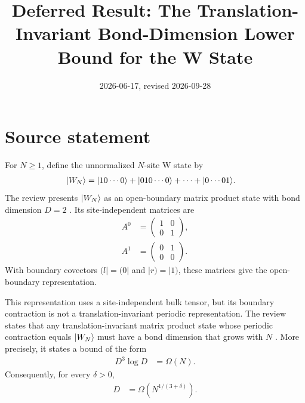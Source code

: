 \documentclass{article}
\title{Deferred Result: The Translation-Invariant Bond-Dimension Lower Bound
for the W State}
\author{}
\date{2026-06-17, revised 2026-09-28}
\begin{document}
\maketitle
{}

\section{Source statement}

For $N\geq 1$, define the unnormalized $N$-site W state by
\begin{align}
    |W_N\rangle
     & =
    |10\cdots 0\rangle
    +|010\cdots 0\rangle
    +\cdots
    +|0\cdots 01\rangle.
    \label{eq:rmp_w_state_ti_bound_w_state}
\end{align}
The review presents $|W_N\rangle$ as an open-boundary matrix product state with
bond dimension $D=2$ \cite[lines~2352--2361]{Cirac2021Matrix}. Its
site-independent matrices are
\begin{align}
    A^0
     & =
    \begin{pmatrix}
        1 & 0 \\
        0 & 1
    \end{pmatrix},
    \label{eq:rmp_w_state_ti_bound_zero_matrix} \\
    A^1
     & =
    \begin{pmatrix}
        0 & 1 \\
        0 & 0
    \end{pmatrix}.
    \label{eq:rmp_w_state_ti_bound_one_matrix}
\end{align}
With boundary covectors $(l|=(0|$ and $|r)=|1)$, these matrices give the
open-boundary representation.

This representation uses a site-independent bulk tensor, but its boundary
contraction is not a translation-invariant periodic representation. The review
states that any translation-invariant matrix product state whose periodic
contraction equals $|W_N\rangle$ must have a bond dimension that grows with
$N$ \cite[line~2362]{Cirac2021Matrix}. More precisely, it states a bound of
the form
\begin{align}
    D^3\log D
     & =
    \Omega(N).
    \label{eq:rmp_w_state_ti_bound_asymptotic_lower_bound}
\end{align}
Consequently, for every $\delta>0$,
\begin{align}
    D
     & =
    \Omega\left(N^{1/(3+\delta)}\right).
    \label{eq:rmp_w_state_ti_bound_polynomial_consequence}
\end{align}
\end{document}
